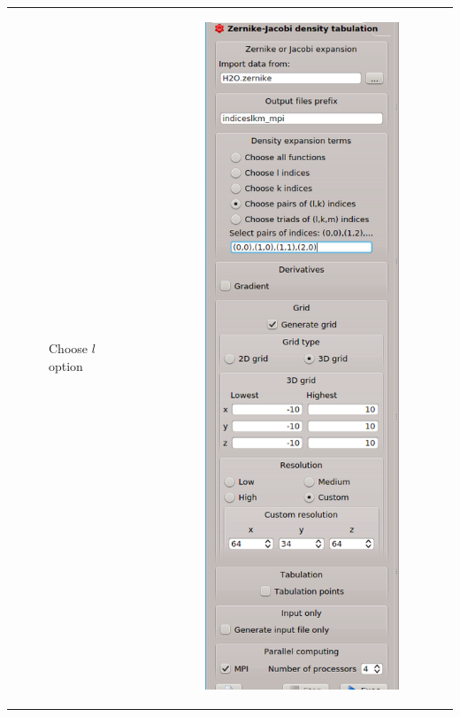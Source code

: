 \documentclass[10pt]{article}
\begin{document}
\begin{tabular}{lcr}
\begin{minipage}{.3\linewidth}
\begin{figure}[H]
\begin{center}
\end{center}
\vspace*{8mm}
\caption{{Choose $l$ option}\label{fig:2_14_2}}
\end{figure}
\end{minipage}
&
\begin{minipage}{.3\linewidth}
\begin{figure}[H]
\begin{center}
\vspace*{0mm}
\includegraphics[width=.75\linewidth]{damqt_fig_2_14_3.png}

\end{center}
\end{figure}
\end{minipage}
\end{tabular}
\end{document}
